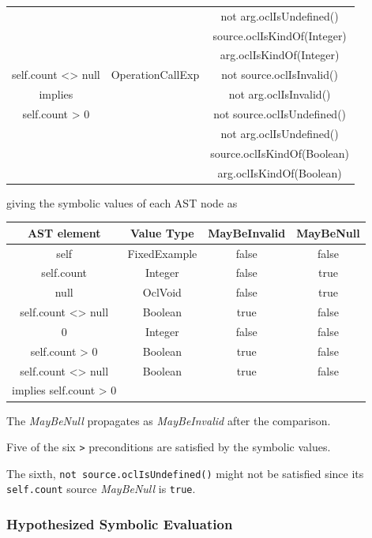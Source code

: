 \documentclass{llncs}
\begin{document}
\begin{center}
\begin{tabular}{|c|c||c|}
		&& not arg.oclIsUndefined() \\
		&& source.oclIsKindOf(Integer) \\
		&& arg.oclIsKindOf(Integer) \\
 		\hline
        self.count <> null & OperationCallExp & not source.oclIsInvalid() \\
		implies && not arg.oclIsInvalid() \\
		self.count > 0 && not source.oclIsUndefined() \\
		&& not arg.oclIsUndefined() \\
		&& source.oclIsKindOf(Boolean) \\
		&& arg.oclIsKindOf(Boolean) \\
		\hline
	\end{tabular}
\end{center}

giving the symbolic values of each AST node as

\begin{center}
	\begin{tabular}{|c||c|c||c|}
		\hline
		AST element & Value Type & MayBeInvalid & MayBeNull \\
		\hline
		\hline
		self & FixedExample & false & false \\
		\hline
		self.count & Integer & false & true\\
		\hline
		null & OclVoid & false & true \\ 
		\hline
		self.count <> null & Boolean & true & false \\
		\hline
		0 & Integer & false & false \\
		\hline
		self.count > 0 & Boolean & true & false \\
		\hline
		self.count <> null & Boolean & true & false \\
		implies self.count > 0 & & & \\
		\hline
	\end{tabular}
\end{center}

The \emph{MayBeNull} propagates as \emph{MayBeInvalid} after the comparison.

Five of the six \verb|>| preconditions are satisfied by the symbolic values.

The sixth, \verb|not source.oclIsUndefined()| might not be satisfied since its \verb|self.count| source \emph{MayBeNull} is \verb|true|.

\subsubsection{Hypothesized Symbolic Evaluation}
\end{document}
